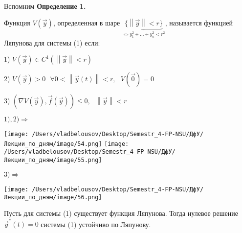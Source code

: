\documentclass[12pt, a4paper]{report}
\begin{document}
\fi


Вспомним \textbf{Определение 1.} 

Функция \( V (\vec{y }  ) \), определенная  в шаре  \( \underbrace{ \{\left\lVert \vec{y }   \right\rVert < r\}}_{\Leftrightarrow  y_1 ^2 + ... + y_n ^2 < r ^2 } \), называется функцией Ляпунова для системы (1) если: 

1) \( V (\vec{y } ) \in  C^1 (\left\lVert \vec{y }  \right\rVert < r ) \) 

2) \( V (\vec{y }  ) > 0 \text{ }  \forall 0 < \left\lVert  \vec{ y}  (t) \right\rVert < r , \text{ }  V(\vec{ 0 } ) =0  \) 

3) \( (\nabla V(\vec{y } ) , \vec{f } (\vec{y } ) ) \le  0 , \text{  }  \left\lVert \vec{y }  \right\rVert < r\)

\( 1) , 2) \Rightarrow  \) 

\begin{center}
    \texttt{[image: /Users/vladbelousov/Desktop/Semestr\_4-FP-NSU/ДфУ/Лекции\_по\_дням/image/54.png]}
    \texttt{[image: /Users/vladbelousov/Desktop/Semestr\_4-FP-NSU/ДфУ/Лекции\_по\_дням/image/55.png]}
\end{center} 

\( 3) \Rightarrow \) 

\begin{center}
    \texttt{[image: /Users/vladbelousov/Desktop/Semestr\_4-FP-NSU/ДфУ/Лекции\_по\_дням/image/56.png]}
\end{center}

\begin{theorem}
    Пусть для системы (1) существует функция Ляпунова. Тогда нулевое решение \( \vec{y } ^* (t ) = 0 \) системы (1) устойчиво по Ляпунову.
\end{theorem}
\end{document}
